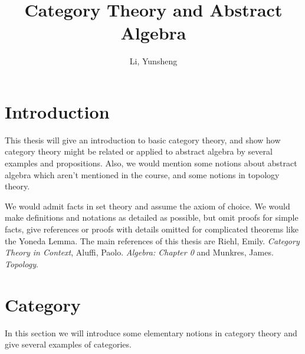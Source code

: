 \documentclass{article}
\title{Category Theory and Abstract Algebra}
\author{Li, Yunsheng}
\date{}
\theoremstyle{definition}
\theoremstyle{definition}
\theoremstyle{remark}
\begin{document}
\maketitle
\tableofcontents

\section*{Introduction}
This thesis will give an introduction to basic category theory, and show how category theory might be related or applied to abstract algebra by several examples and propositions. Also, we would mention some notions about abstract algebra which aren't mentioned in the course, and some notions in topology theory. \par
We would admit facts in set theory and assume the axiom of choice. We would make definitions and notations as detailed as possible, but omit proofs for simple facts, give references or proofs with details omitted for complicated theorems like the Yoneda Lemma. The main references of this thesis are Riehl, Emily. \textsl{Category Theory in Context}, Aluffi, Paolo. \textsl{Algebra: Chapter 0} and Munkres, James. \textsl{Topology}.
\newpage
\section{Category}
In this section we will introduce some elementary notions in category theory and give several examples of categories.
	
\end{document}
